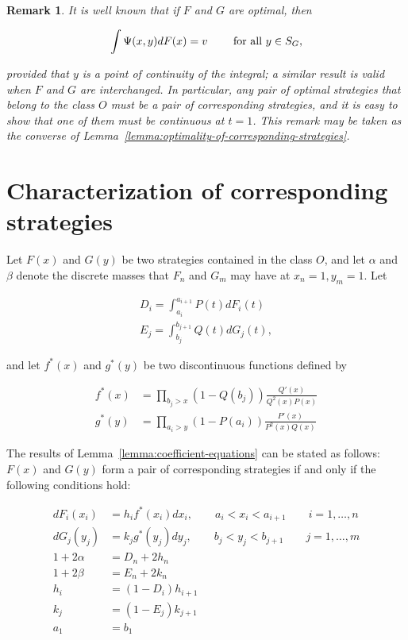 \documentclass{article}
\newtheorem{remark}{Remark}
\begin{document}
\begin{remark}

It is well known that if $F$ and $G$ are optimal, then

\[
\int \Psi(x, y) dF(x) = v \qquad \textup{ for all } y \in S_G,
\]

provided that $y$ is a point of continuity of the integral; a similar result is
valid when $F$ and $G$ are interchanged. In particular, any pair of optimal
strategies that belong to the class $O$ must be a pair of corresponding
strategies, and it is easy to show that one of them must be continuous at
$t=1$. This remark may be taken as the converse of
Lemma~\ref{lemma:optimality-of-corresponding-strategies}.

\end{remark}

\section{Characterization of corresponding strategies}

Let $F(x)$ and $G(y)$ be two strategies contained in the class $O$, and let
$\alpha$ and $\beta$ denote the discrete masses that $F_n$ and $G_m$ may have
at $x_n = 1, y_m=1$. Let

\[
\begin{aligned}
D_i = \int_{a_i}^{a_{i+1}} P(t) dF_i(t) \\
E_j = \int_{b_j}^{b_{j+1}} Q(t) dG_j(t),
\end{aligned}
\]

and let $f^*(x)$ and $g^*(y)$ be two discontinuous functions defined by

\begin{align}
f^*(x) &= \prod_{b_j > x} (1-Q(b_j)) \frac{Q'(x)}{Q^2(x) P(x)}
\label{eqn:characterization-6} \\
g^*(y) &= \prod_{a_i > y} (1-P(a_i)) \frac{P'(x)}{P^2(x) Q(x)} \label{eqn:characterization-7}
\end{align}

The results of Lemma~\ref{lemma:coefficient-equations} can be stated as
follows: $F(x)$ and $G(y)$ form a pair of corresponding strategies if and only
if the following conditions hold:

\begin{align}
dF_i(x_i) &= h_i f^*(x_i) dx_i, \qquad a_i < x_i < a_{i+1} \qquad i=1, \dots, n \label{eqn:characterization-8} \\
dG_j(y_j) &= k_j g^*(y_j) dy_j, \qquad b_j < y_j < b_{j+1} \qquad j=1, \dots, m \label{eqn:characterization-9} \\
1 + 2 \alpha &= D_n + 2h_n \label{eqn:characterization-10} \\
1 + 2 \beta &= E_n + 2k_n \label{eqn:characterization-11} \\
h_i &= (1-D_i) h_{i+1} \label{eqn:characterization-12} \\
k_j &= (1-E_j) k_{j+1} \label{eqn:characterization-13} \\
a_1 &= b_1
\end{align}
\end{document}

